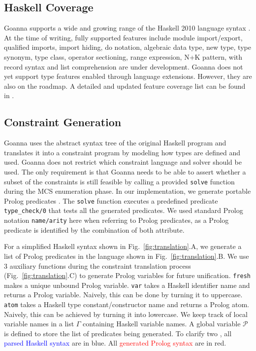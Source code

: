     \subsection{Haskell Coverage}
    Goanna supports a wide and growing range of the Haskell 2010 language syntax \cite{Simon_Marlow2010-lg}. At the time of writing, fully supported features include module import/export, qualified imports, import hiding, do notation, algebraic data type, new type, type synonym, type class, operator sectioning, range expression, N+K pattern, with record syntax and list comprehension are under development. Goanna does not yet support type features enabled through language extensions. However, they are also on the roadmap. A detailed and updated feature coverage list can be found in \cite{Anonymous2023-rp}.

    \subsection{Constraint Generation} \label{sub:translation}
    Goanna uses the abstract syntax tree of the original Haskell program and translates it into a constraint program by modeling how types are defined and used. Goanna does not restrict which constraint language and solver should be used. The only requirement is that Goanna needs to be able to assert whether a subset of the constraints is still feasible by calling a provided \texttt{solve} function during the MCS enumeration phase. In our implementation, we generate portable Prolog predicates \cite{Wielemaker2011-sr}. The \texttt{solve} function executes a predefined predicate \texttt{type\_check/0} that tests all the generated predicates. We used standard Prolog notation \texttt{name/arity} here when referring to Prolog predicates, as a Prolog predicate is identified by the combination of both attribute. 

    
    For a simplified Haskell syntax shown in Fig.~\ref{fig:translation}.A, we generate a list of Prolog predicates in the language shown in Fig.~\ref{fig:translation}.B. We use 3 auxiliary functions during the constraint translation process (Fig.~\ref{fig:translation}.C) to generate Prolog variables for future unification. \texttt{fresh} makes a unique unbound Prolog variable. \texttt{var} takes a Haskell identifier name and returns a Prolog variable. Naively, this can be done by turning it to uppercase. \texttt{atom} takes a Haskell type constant/constructor name and returns a Prolog atom. Naively, this can be achieved by turning it into lowercase. We keep track of local variable names in a list $\Gamma$ containing Haskell variable names. A global variable $\mathcal{P}$ is defined to store the list of predicates being generated. To clarify two , all \textcolor{blue}{parsed Haskell syntax} are in blue. All \textcolor{red}{generated Prolog syntax} are in red. 
    
